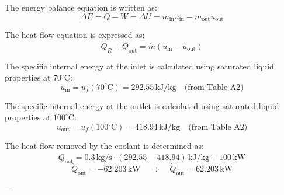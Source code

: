 The energy balance equation is written as:  
\[
\Delta E = Q - W = \Delta U = m_{\text{in}} u_{\text{in}} - m_{\text{out}} u_{\text{out}}
\]  

The heat flow equation is expressed as:  
\[
\dot{Q}_R + \dot{Q}_{\text{out}} = \dot{m} (u_{\text{in}} - u_{\text{out}})
\]  

The specific internal energy at the inlet is calculated using saturated liquid properties at \( 70^\circ\text{C} \):  
\[
u_{\text{in}} = u_f(70^\circ\text{C}) = 292.55 \, \text{kJ/kg} \quad \text{(from Table A2)}
\]  

The specific internal energy at the outlet is calculated using saturated liquid properties at \( 100^\circ\text{C} \):  
\[
u_{\text{out}} = u_f(100^\circ\text{C}) = 418.94 \, \text{kJ/kg} \quad \text{(from Table A2)}
\]  

The heat flow removed by the coolant is determined as:  
\[
\dot{Q}_{\text{out}} = 0.3 \, \text{kg/s} \cdot (292.55 - 418.94) \, \text{kJ/kg} + 100 \, \text{kW}
\]  
\[
\dot{Q}_{\text{out}} = -62.203 \, \text{kW} \quad \Rightarrow \quad \dot{Q}_{\text{out}} = 62.203 \, \text{kW}
\]  

---